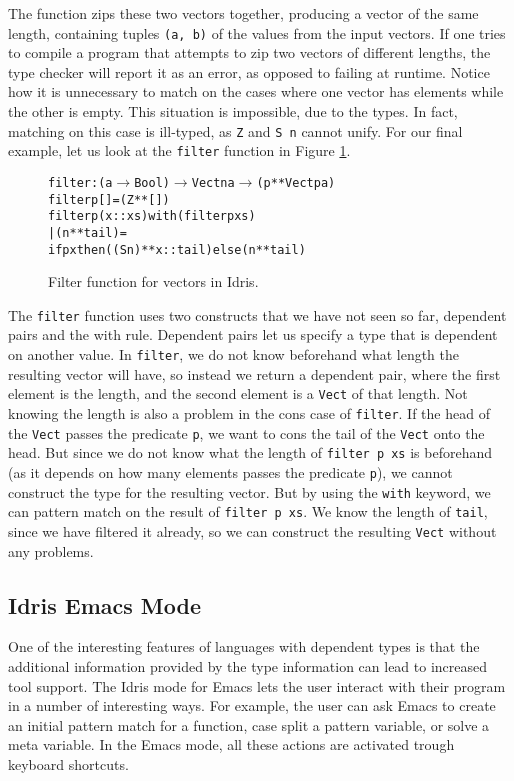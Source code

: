 The function zips these two vectors together, producing a vector of the same length, containing tuples \texttt{(a, b)} of the values from the input vectors. If one tries to compile a program that attempts to zip two vectors of different lengths, the type checker will report it as an error, as opposed to failing at runtime. Notice how it is unnecessary to match on the cases where one vector has elements while the other is empty. This situation is impossible, due to the types. In fact, matching on this case is ill-typed, as \texttt{Z} and \texttt{S~n} cannot unify. For our final example, let us look at the \texttt{filter} function in Figure \ref{fig:filter}.

\begin{figure}
\begin{alltt}
filter : (a \(\to\) Bool) \(\to\) Vect n a \(\to\) (p ** Vect p a)
filter p [] = (Z ** [])
filter p (x::xs) with (filter p xs)
  | (n ** tail) =
    if p x then ((S n) ** x::tail) else (n ** tail)
\end{alltt}
\caption{Filter function for vectors in Idris.}
\label{fig:filter}
\end{figure}

The \texttt{filter} function uses two constructs that we have not seen so far, dependent pairs and the with rule. Dependent pairs let us specify a type that is dependent on another value. In \texttt{filter}, we do not know beforehand what length the resulting vector will have, so instead we return a dependent pair, where the first element is the length, and the second element is a \texttt{Vect} of that length. Not knowing the length is also a problem in the cons case of \texttt{filter}. If the head of the \texttt{Vect} passes the predicate \texttt{p}, we want to cons the tail of the \texttt{Vect} onto the head. But since we do not know what the length of \texttt{filter p xs} is beforehand (as it depends on how many elements passes the predicate \texttt{p}), we cannot construct the type for the resulting vector. But by using the \texttt{with} keyword, we can pattern match on the result of \texttt{filter p xs}. We know the length of \texttt{tail}, since we have filtered it already, so we can construct the resulting \texttt{Vect} without any problems.

\subsection{Idris Emacs Mode}
One of the interesting features of languages with dependent types is that the additional information provided by the type information can lead to increased tool support.
The Idris mode for Emacs lets the user interact with their program in a number of interesting ways.
For example, the user can ask Emacs to create an initial pattern match for a function, case split a pattern variable, or solve a meta variable.
In the Emacs mode, all these actions are activated trough keyboard shortcuts.

